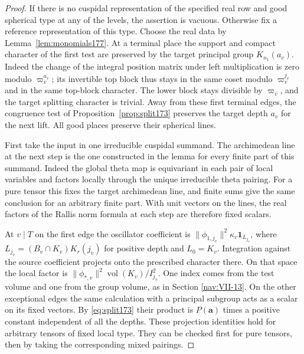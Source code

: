 \documentclass[a4paper,11pt]{article}
\theoremstyle{definition}
\theoremstyle{remark}
\numberwithin{equation}{section}
\begin{document}
\begin{proof}
If there is no cuspidal representation of the specified
real row and good spherical type at any of the levels, the
assertion is vacuous. Otherwise fix a reference representation
of this type. Choose the real data by Lemma~\ref{lem:monomials177}.
At a terminal place the support and compact character of
the first test are preserved by the target principal group
\(K_{n_1}(a_v)\). Indeed the change of the integral position
matrix under left multiplication is zero modulo
\(\varpi_v^{a_v}\); its invertible top block thus stays in
the same coset modulo \(\varpi_v^{j_v}\) and in the same
top-block character. The lower block stays divisible by
\(\varpi_v\), and the target splitting character is trivial.
Away from these first terminal edges, the congruence test
of Proposition~\ref{prop:split173} preserves the target
depth \(a_v\) for the next lift. All good places preserve
their spherical lines.

First take the input in one irreducible cuspidal summand.
The archimedean line at the next step is the one constructed
in the lemma for every finite part of this summand. Indeed
the global theta map is equivariant in each pair of local
variables and factors locally through the unique irreducible
theta pairing. For a pure tensor this fixes the target
archimedean line, and finite sums give the same conclusion
for an arbitrary finite part. With unit vectors on the
lines, the real factors of the Rallis norm formula at
each step are therefore fixed scalars.

At \(v\mid T\) on the first edge the oscillator coefficient is
\(\|\phi_{1,j_v}\|^2\kappa_v\mathbf1_{L_{j_v}}\),
where \(L_{j_v}=(B_v\cap K_v)K_r(j_v)\) for positive
depth and \(L_0=K_v\). Integration against the source
coefficient projects onto the prescribed character there.
On that space the local factor is
\(\|\phi_{*,v}\|^2\operatorname{vol}(K_v)/I_{j_v}^2\).
One index comes from the test volume and one from the
group volume, as in Section \ref{nav:VII-13}. On the other exceptional
edges the same calculation with a principal subgroup acts
as a scalar on its fixed vectors. By
\eqref{eq:split173} their product is \(P(\mathbf a)\)
times a positive constant independent of all the depths.
These projection identities hold for arbitrary tensors of
fixed local type. They can be checked first for pure tensors,
then by taking the corresponding mixed pairings.


\end{proof}
\end{document}
